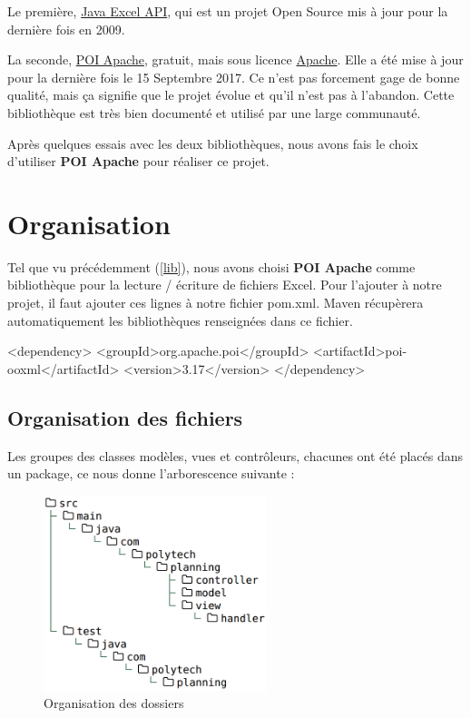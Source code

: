 \documentclass{polytech/polytech}
\begin{document}
	Le première, \href{http://jexcelapi.sourceforge.net/}{Java Excel API}, qui est un projet Open Source mis à jour pour la dernière fois en 2009.

	\label{lib}
	La seconde, \href{http://poi.apache.org}{POI Apache}, gratuit, mais sous licence \href{https://www.apache.org/licenses/}{Apache}.
	Elle a été mise à jour pour la dernière fois le 15 Septembre 2017.
	Ce n'est pas forcement gage de bonne qualité, mais ça signifie que le projet évolue et qu'il n'est pas à l'abandon.
	Cette bibliothèque est très bien documenté et utilisé par une large communauté.

	Après quelques essais avec les deux bibliothèques, nous avons fais le choix d'utiliser \textbf{POI Apache} pour réaliser ce projet.

	\section{Organisation}

	Tel que vu précédemment (\ref{lib}), nous avons choisi \textbf{POI Apache} comme bibliothèque pour la lecture / écriture de fichiers Excel.
	Pour l'ajouter à notre projet, il faut ajouter ces lignes à notre fichier pom.xml.
	Maven récupèrera automatiquement les bibliothèques renseignées dans ce fichier.

	\begin{latexsource}
	<dependency>
		<groupId>org.apache.poi</groupId>
		<artifactId>poi-ooxml</artifactId>
		<version>3.17</version>
	</dependency>
	\end{latexsource}

	\pagebreak

	\subsection{Organisation des fichiers}

	Les groupes des classes modèles, vues et contrôleurs, chacunes ont été placés dans un package, ce nous donne l'arborescence suivante :

	\begin{figure}
		\caption{Organisation des dossiers}
		\includegraphics[width=6.5cm]{./img/folder-planning-w.png}
	\end{figure}
\end{document}
